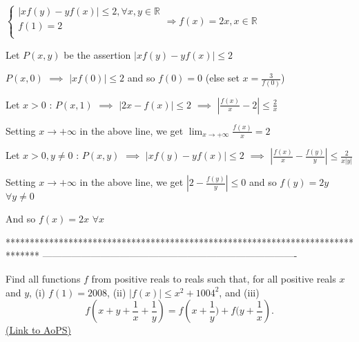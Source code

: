 \begin{solution}
	\begin{tcolorbox}$\displaystyle \begin{cases}
\left|xf(y)-yf(x) \right|\leq 2 ,\forall x,y \in \mathbb{R}  \\ 
 f(1)=2  \\ 
  
\end{cases}\Longrightarrow f(x)=2x,x\in \mathbb{R}$\end{tcolorbox}
Let $P(x,y)$ be the assertion $|xf(y)-yf(x)|\le 2$

$P(x,0)$ $\implies$ $|xf(0)|\le 2$ and so $f(0)=0$ (else set $x=\frac 3{f(0)}$)

Let $x>0$ : $P(x,1)$ $\implies$ $|2x-f(x)|\le 2$ $\implies$ $\left|\frac{f(x)}x-2\right|\le\frac 2x$

Setting $x\to+\infty$ in the above line, we get $\lim_{x\to+\infty}\frac{f(x)}x=2$

Let $x>0,y\ne 0$ : $P(x,y)$ $\implies$ $|xf(y)-yf(x)|\le 2$ $\implies$ $\left|\frac{f(x)}x-\frac{f(y)}y\right|\le\frac 2{x|y|}$

Setting $x\to+\infty$ in the above line, we get $\left|2-\frac{f(y)}y\right|\le 0$ and so $f(y)=2y$ $\forall y\ne 0$

And so $f(x)=2x$ $\forall x$
\end{solution}
*******************************************************************************
-------------------------------------------------------------------------------

\begin{problem}
	Find all functions $f$ from positive reals to reals such that, for all positive reals $x$ and $y$, 
(i) $f(1)=2008$,
(ii) $|f(x)| \leq x^2+1004^2$, and
(iii) \[f\left(x+y+\frac{1}{x}+\frac{1}{y}\right)=f\left(x+\frac{1}{y})+f(y+\frac{1}{x}\right).\]
	\flushright \href{https://artofproblemsolving.com/community/c6h440604}{(Link to AoPS)}
\end{problem}



